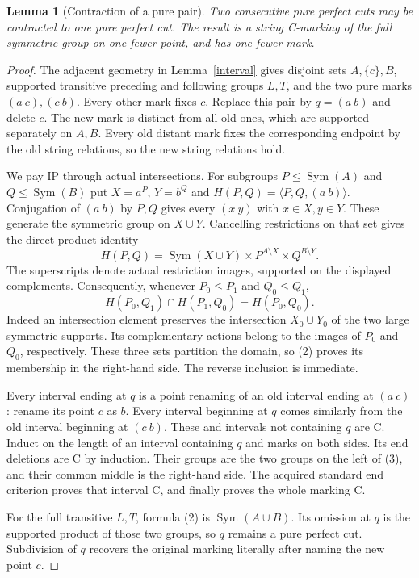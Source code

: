 \documentclass[11pt,a4paper]{article}
\newtheorem{lemma}{Lemma}\newtheorem{theorem}[lemma]{Theorem}
\newcommand{\gen}[1]{\langle#1\rangle}
\newcommand{\Sym}{\operatorname{Sym}}
\begin{document}
\begin{lemma}[Contraction of a pure pair]\label{contract}
Two consecutive pure perfect cuts may be contracted to one pure
perfect cut. The result is a string C-marking of the full symmetric
group on one fewer point, and has one fewer mark.
\end{lemma}
\begin{proof}
The adjacent geometry in Lemma~\ref{interval} gives disjoint sets
$A,\{c\},B$, supported transitive preceding and following groups
$L,T$, and the two pure marks $(a\ c),(c\ b)$. Every other mark
fixes $c$. Replace this pair by $q=(a\ b)$ and delete $c$.
The new mark is distinct from all old ones, which are supported
separately on $A,B$. Every old distant mark fixes the corresponding
endpoint by the old string relations, so the new string relations hold.

We pay IP through actual intersections. For subgroups $P\le\Sym(A)$
and $Q\le\Sym(B)$ put $X=a^P$, $Y=b^Q$ and
$H(P,Q)=\gen{P,Q,(a\ b)}$. Conjugation of $(a\ b)$ by $P,Q$
gives every $(x\ y)$ with $x\in X,y\in Y$. These generate the
symmetric group on $X\cup Y$. Cancelling restrictions on that set
gives the direct-product identity
\[
 H(P,Q)=\Sym(X\cup Y)\times P^{A\setminus X}
                         \times Q^{B\setminus Y}.        \tag{2}
\]
The superscripts denote actual restriction images, supported on
the displayed complements. Consequently, whenever $P_0\le P_1$
and $Q_0\le Q_1$,
\[
 H(P_0,Q_1)\cap H(P_1,Q_0)=H(P_0,Q_0).                  \tag{3}
\]
Indeed an intersection element preserves the intersection
$X_0\cup Y_0$ of the two large symmetric supports. Its complementary
actions belong to the images of $P_0$ and $Q_0$, respectively.
These three sets partition the domain, so (2) proves its membership
in the right-hand side. The reverse inclusion is immediate.

Every interval ending at $q$ is a point renaming of an old interval
ending at $(a\ c)$: rename its point $c$ as $b$. Every interval
beginning at $q$ comes similarly from the old interval beginning at
$(c\ b)$. These and intervals not containing $q$ are C. Induct
on the length of an interval containing $q$ and marks on both sides.
Its end deletions are C by induction. Their groups are the two groups
on the left of (3), and their common middle is the right-hand side.
The acquired standard end criterion proves that interval C, and
finally proves the whole marking C.

For the full transitive $L,T$, formula (2) is $\Sym(A\cup B)$.
Its omission at $q$ is the supported product of those two groups,
so $q$ remains a pure perfect cut. Subdivision of $q$ recovers the
original marking literally after naming the new point $c$.
\end{proof}
\end{document}
